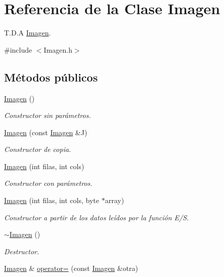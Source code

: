 \hypertarget{classImagen}{}\section{Referencia de la Clase Imagen}
\label{classImagen}


T.\+D.\+A \hyperlink{classImagen}{Imagen}.  




{\ttfamily \#include $<$Imagen.\+h$>$}

\subsection*{Métodos públicos}
\begin{DoxyCompactItemize}
\item 
\hyperlink{classImagen_ab2e649aa7a105155c7bfdb846abf0528}{Imagen} ()
\begin{DoxyCompactList}\small\item\em Constructor sin parámetros. \end{DoxyCompactList}\item 
\hyperlink{classImagen_a70437d2848ae5b030ee17cf79651a8b5}{Imagen} (const \hyperlink{classImagen}{Imagen} \&J)
\begin{DoxyCompactList}\small\item\em Constructor de copia. \end{DoxyCompactList}\item 
\hyperlink{classImagen_ad4943ff0e2de31d4c25a879030f3ebf2}{Imagen} (int filas, int cols)
\begin{DoxyCompactList}\small\item\em Constructor con parámetros. \end{DoxyCompactList}\item 
\hyperlink{classImagen_a9630d5a1b9896c9b132a76e8015c1ed2}{Imagen} (int filas, int cols, byte $\ast$array)
\begin{DoxyCompactList}\small\item\em Constructor a partir de los datos leídos por la función E/S. \end{DoxyCompactList}\item 
\hyperlink{classImagen_a03dd93c9cf920a9dc0b72f8bd34f2e8a}{$\sim$\+Imagen} ()
\begin{DoxyCompactList}\small\item\em Destructor. \end{DoxyCompactList}\item 
\hyperlink{classImagen}{Imagen} \& \hyperlink{classImagen_a2d30fa014a342dbf0f9d992be6838adf}{operator=} (const \hyperlink{classImagen}{Imagen} \&otra)

\end{DoxyCompactItemize}
